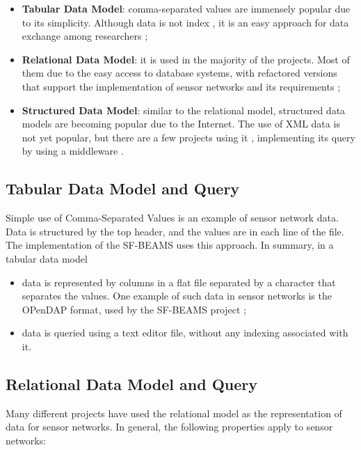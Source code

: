 \begin{itemize}
  \item \textbf{Tabular Data Model}: comma-separated values are immensely
  popular due to its simplicity. Although data is not index , it is an easy
  approach for data exchange among researchers \cite{sn-provenance};
  \item \textbf{Relational Data Model}: it is used in the majority of the
  projects. Most of them due to the easy access to database systems, with
  refactored versions that support the implementation of sensor networks and
  its requirements \cite{sn-db-tinydb};
  \item \textbf{Structured Data Model}: similar to the relational model,
  structured data models are becoming popular due to the Internet. The use of
  XML data \cite{xml} is not yet popular, but there are a few projects using
  it \cite{sn-xml-usage01}\cite{sn-xml-usage02}, implementing its query by
  using a middleware \cite{sn-xml-middleware}\cite{sn-xml-query-engines}.
\end{itemize}

\subsection{Tabular Data Model and Query}

Simple use of Comma-Separated Values is an example of sensor network data. Data
is structured by the top header, and the values are in each line of the file.
The implementation of the SF-BEAMS \cite{sfbeams2006} uses this approach. In
summary, in a tabular data model 

\begin{itemize}
  \item data is represented by columns in a flat file separated by a character
  that separates the values. One example of such data in sensor networks is the
  OPenDAP \cite{opendap} format, used by the SF-BEAMS project
  \cite{sfbeams2006};
  \item data is queried using a text editor file, without any indexing
  associated with it.
\end{itemize}

\subsection{Relational Data Model and Query}

Many different projects have used the relational model \cite{relational-model}
as the representation of data for sensor networks. In general, the following
properties apply to sensor networks:

